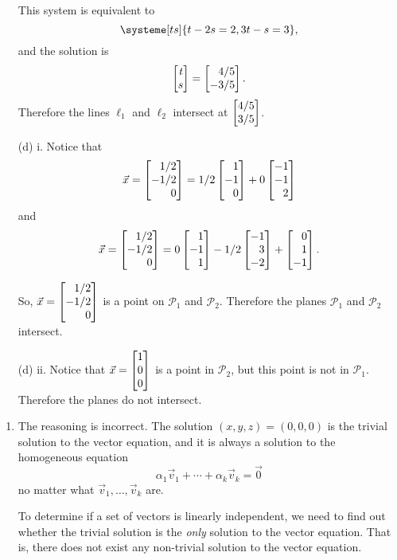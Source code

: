 \begin{exercises}
\begin{problist}
\begin{enumerate}
			This system is equivalent to
			\[
				\systeme[ts]{t-2s=2,3t-s=3},
			\]
			and the solution is
			\[
				\mat{t\\s}=\mat{4/5\\-3/5}.
			\]
			Therefore the lines $\ell_1$ and $\ell_2$ intersect at $\mat{4/5\\3/5}$.

		\item[(d) i.] 	Notice that
			\[
				\vec x=\mat{1/2\\-1/2\\0}=1/2\mat{1\\-1\\0}+0\mat{-1\\-1\\2}
			\]
			and
			\[
				\vec x=\mat{1/2\\-1/2\\0}=0\mat{1\\-1\\1}-1/2\mat{-1\\3\\-2}+\mat{0\\1\\-1}.
			\]
			
			So, $\vec x=\mat{1/2\\-1/2\\0}$ is a point on $\mathcal{P}_{1}$
			and $\mathcal{P}_{2}$. Therefore the planes $\mathcal{P}_{1}$ and
			$\mathcal{P}_{2}$ intersect.
			
		\item[(d) ii.] Notice that $\vec x=\mat{1\\0\\0}$ is a point in $\mathcal{P}_{2}$,
			but this point is not in $\mathcal P_1$. Therefore the planes do not intersect.

		\end{enumerate}
		\begin{solution}
			\begin{enumerate}
				\item The reasoning is incorrect. The solution
				$(x, y, z)=(0, 0, 0)$ is the trivial solution to the vector
				equation, and it is always a solution to the homogeneous equation
				\[
					\alpha_1\vec v_1+\cdots+\alpha_k\vec v_k=\vec 0
				\]
				no matter what $\vec v_{1}, \dots, \vec v_{k}$ are.
				
				To determine if a set of vectors is linearly independent, we
				need to find out whether the trivial solution is the \emph{only}
				solution to the vector equation. That is, there does not exist
				any non-trivial solution to the vector equation.
				

\end{enumerate}
\end{solution}
\end{problist}
\end{exercises}
